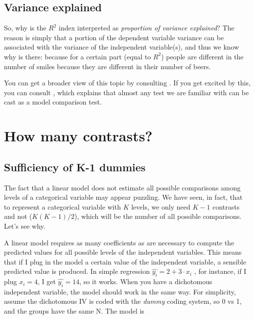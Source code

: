 \documentclass[
]{book}
\begin{document}
\hypertarget{variance-explained}{%
\section{Variance explained}\label{variance-explained}}

So, why is the \(R^2\) index interpreted as \emph{proportion of variance explained}? The reason is simply that a portion of the dependent variable variance can be associated with the variance of the independent variable(s), and thus we know why is there: because for a certain part (equal to \(R^2\)) people are different in the number of smiles because they are different in their number of beers.

You can get a broader view of this topic by consulting \citet{judd2017data}. If you get excited by this, you can consult \citet{searle2016linear}, which explains that almost any test we are familiar with can be cast as a model comparison test.

\hypertarget{a1dummies}{%
\chapter{How many contrasts?}\label{a1dummies}}

\hypertarget{sufficiency-of-k-1-dummies}{%
\section{Sufficiency of K-1 dummies}\label{sufficiency-of-k-1-dummies}}

The fact that a linear model does not estimate all possible comparisons among levels of a categorical variable may appear puzzling. We have seen, in fact, that to represent a categorical variable with \(K\) levels, we only need \(K-1\) contrasts and not (\(K(K-1)/2\)), which will be the number of all possible comparisons. Let's see why.

A linear model requires as many coefficients as are necessary to compute the predicted values for all possible levels of the independent variables. This means that if I plug in the model a certain value of the independent variable, a sensible predicted value is produced. In simple regression \(\hat{y_i}=2+3 \cdot x_i\) , for instance, if I plug \(x_i=4\), I get \(\hat{y_i}=14\), so it works. When you have a dichotomous independent variable, the model should work in the same way. For simplicity, assume the dichotomous IV is coded with the \emph{dummy} coding system, so 0 vs 1, and the groups have the same N. The model is
\end{document}
